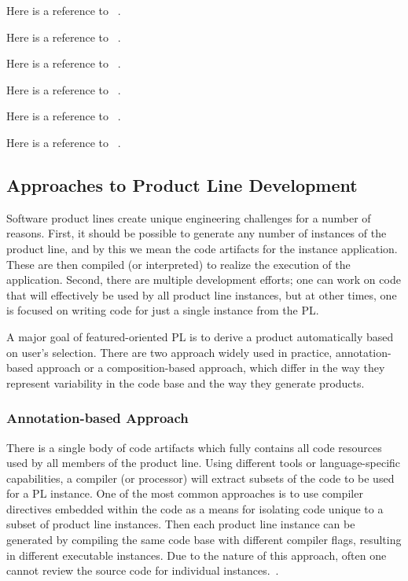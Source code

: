 Here is a reference to ~\cite{Arcaini:2017:ARV:3106195.3106206}.

Here is a reference to ~\cite{Heineman:2015:TMO:2791060.2791076}.

Here is a reference to ~\cite{Vasilevskiy:2016:TRP:2934466.2934484}.

Here is a reference to ~\cite{Kuhn:2015:CPC:2791060.2791092}.

Here is a reference to ~\cite{Schaefer:2010:DPS:1885639.1885647}.

Here is a reference to ~\cite{Apel:2008:AFF:1428476.1428480}.





\subsection{Approaches to Product Line Development}

Software product lines create unique engineering challenges for a number of reasons. First, it should be
possible to generate any number of  instances of the product line, and by this we mean the code artifacts
for the instance application. These are then compiled (or interpreted) to realize the execution of the
application. Second, there are multiple development efforts; one can work on code that will effectively be
used by all product line instances, but at other times, one is focused on writing code for just a single
instance from the PL.

A major goal of featured-oriented PL is to derive a product automatically based on user’s selection. There are
two approach widely used in practice,  annotation-based approach or a composition-based approach, which differ in
the way they represent variability in the code base and the way they generate products.


\subsubsection{Annotation-based Approach}

There is a single body of code artifacts which fully contains all code resources used by all members of the product line.
Using different tools or language-specific capabilities, a compiler (or processor) will extract subsets of the code to be used
 for a PL instance. One of the most common approaches is to use compiler directives embedded within the code as a means
 for isolating code unique to a subset of product line instances. Then each product line instance can be generated
 by compiling the same code base with different compiler flags, resulting in different executable instances.
 Due to the nature of this approach, often one cannot review the source code for individual instances.~\cite{Apel:2013:FSP:2541773}.

